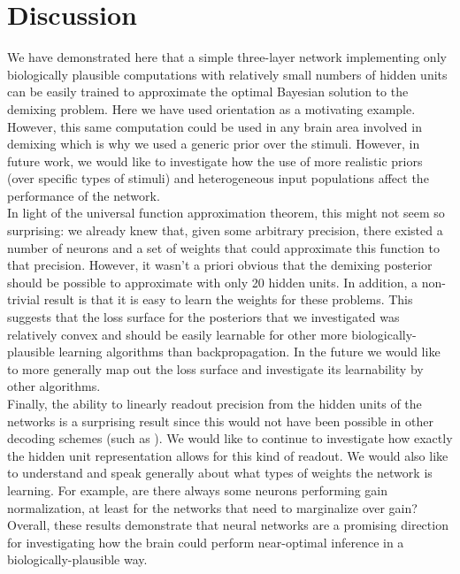 \documentclass{article} %
\begin{document}
\section{Discussion}
We have demonstrated here that a simple three-layer network implementing only biologically plausible computations with relatively small numbers of hidden units can be easily trained to approximate the optimal Bayesian solution to the demixing problem. Here we have used orientation as a motivating example. However, this same computation could be used in any brain area involved in demixing which is why we used a generic prior over the stimuli. However, in future work, we would like to investigate how the use of more realistic priors (over specific types of stimuli) and heterogeneous input populations affect the performance of the network.
\\
In light of the universal function approximation theorem, this might not seem so surprising: we already knew that, given some arbitrary precision, there existed a number of neurons and a set of weights that could approximate this function to that precision. However, it wasn't a priori obvious that the demixing posterior should be possible to approximate with only 20 hidden units. In addition, a non-trivial result is that it is easy to learn the weights for these problems. This suggests that the loss surface for the posteriors that we investigated was relatively convex and should be easily learnable for other more biologically-plausible learning algorithms than backpropagation. In the future we would like to more generally map out the loss surface and investigate its learnability by other algorithms. 
\\
Finally, the ability to linearly readout precision from the hidden units of the networks is a surprising result since this would not have been possible in other decoding schemes (such as \cite{Qamar10122013}). We would like to continue to investigate how exactly the hidden unit representation allows for this kind of readout. We would also like to understand and speak generally about what types of weights the network is learning. For example, are there always some neurons performing gain normalization, at least for the networks that need to marginalize over gain?
\\
Overall, these results demonstrate that neural networks are a promising direction for investigating how the brain could perform near-optimal inference in a biologically-plausible way.



\end{document}
